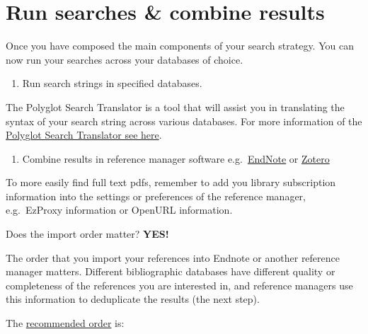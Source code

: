 \documentclass[
]{book}
\providecommand{\tightlist}{%
  \setlength{\itemsep}{0pt}\setlength{\parskip}{0pt}}
\begin{document}
\hypertarget{run-searches-combine-results}{%
\section{Run searches \& combine results}\label{run-searches-combine-results}}

Once you have composed the main components of your search strategy. You can now run your searches across your databases of choice.

\begin{enumerate}
\def\labelenumi{\arabic{enumi}.}
\tightlist
\item
  Run search strings in specified databases.
\end{enumerate}

The Polyglot Search Translator is a tool that will assist you in translating the syntax of your search string across various databases. For more information of the \href{https://sr-accelerator.com/\#/polyglot}{Polyglot Search Translator see here}.

\begin{enumerate}
\def\labelenumi{\arabic{enumi}.}
\setcounter{enumi}{1}
\tightlist
\item
  Combine results in reference manager software e.g.~\href{https://endnote.com/}{EndNote} or \href{https://www.zotero.org/}{Zotero}
\end{enumerate}

To more easily find full text pdfs, remember to add you library subscription information into the settings or preferences of the reference manager, e.g.~EzProxy information or OpenURL information.

Does the import order matter? \textbf{YES!}

The order that you import your references into Endnote or another reference manager matters. Different bibliographic databases have different quality or completeness of the references you are interested in, and reference managers use this information to deduplicate the results (the next step).

The \href{https://blogs.lshtm.ac.uk/library/2018/12/07/removing-duplicates-from-an-endnote-library/}{recommended order} is:
\end{document}
